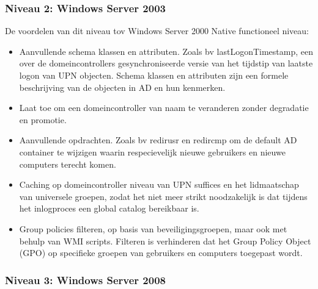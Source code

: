 \subsubsection{Niveau 2: Windows Server 2003}

De voordelen van dit niveau tov Windows Server 2000 Native functioneel niveau:
\begin{itemize}
	\item Aanvullende schema klassen en attributen. Zoals bv
		lastLogonTimestamp, een over de domeincontrollers
		gesynchroniseerde versie van het tijdstip van laatste logon van
		UPN objecten. Schema klassen en attributen zijn een formele
		beschrijving van de objecten in AD en hun kenmerken.
	\item Laat toe om een domeincontroller van naam te veranderen zonder
		degradatie en promotie.
	\item Aanvullende opdrachten. Zoals bv redirusr en redircmp om de
		default AD container te wijzigen waarin respecievelijk nieuwe
		gebruikers en nieuwe computers terecht komen.
	\item Caching op domeincontroller niveau van UPN suffices en het
		lidmaatschap van universele groepen, zodat het niet meer strikt
		noodzakelijk is dat tijdens het inlogproces een global catalog
		bereikbaar is.
	\item Group policies filteren, op basis van beveiligingsgroepen, maar
		ook met behulp van WMI scripts. Filteren is verhinderen dat het
		Group Policy Object (GPO) op specifieke groepen van gebruikers en 
		computers toegepast wordt.
\end{itemize}

\subsubsection{Niveau 3: Windows Server 2008}

